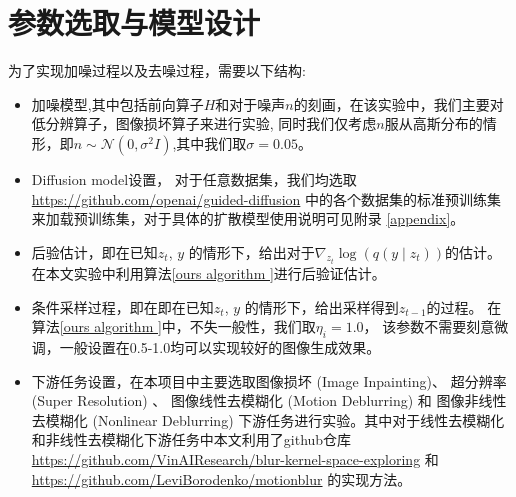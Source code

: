 
\section{参数选取与模型设计}
为了实现加噪过程以及去噪过程，需要以下结构: 
\begin{itemize}
    \item 加噪模型,其中包括前向算子$H$和对于噪声$n$的刻画，在该实验中，我们主要对低分辨算子，图像损坏算子来进行实验, 同时我们仅考虑$n$服从高斯分布的情形，即$n\sim \mathcal{N}(0,\sigma^2 I)$,其中我们取$\sigma=0.05$。 
    \item Diffusion model设置， 对于任意数据集，我们均选取 \href{https://github.com/openai/guided-diffusion}{https://github.com/openai/guided-diffusion} 中的各个数据集的标准预训练集来加载预训练集，对于具体的扩散模型使用说明可见附录 \ref{appendix}。 
    \item  后验估计，即在已知$z_t$, $y$ 的情形下，给出对于$\nabla_{z_t}\log\left(q(y\mid z_t)\right)$的估计。 在本文实验中利用算法\ref{ours algorithm }进行后验证估计。
    \item 条件采样过程，即在即在已知$z_t$, $y$ 的情形下，给出采样得到$z_{t-1}$的过程。 在算法\ref{ours algorithm }中，不失一般性，我们取$\eta_i=1.0$， 该参数不需要刻意微调，一般设置在0.5-1.0均可以实现较好的图像生成效果。 
    \item 下游任务设置，在本项目中主要选取图像损坏 
  (Image Inpainting)、 超分辨率 (Super Resolution) 、 图像线性去模糊化 (Motion Deblurring) 和 图像非线性去模糊化 (Nonlinear Deblurring) 下游任务进行实验。其中对于线性去模糊化和非线性去模糊化下游任务中本文利用了github仓库 \href{https://github.com/VinAIResearch/blur-kernel-space-exploring}{https://github.com/VinAIResearch/blur-kernel-space-exploring} 和 \href{https://github.com/LeviBorodenko/motionblur}{https://github.com/LeviBorodenko/motionblur} 的实现方法。 
\end{itemize}



